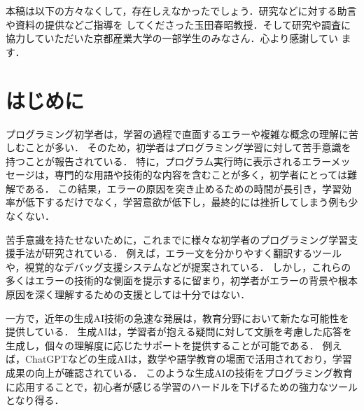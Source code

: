 \documentclass[12pt,twoside]{jbook}
\begin{document}
\begin{acknowledgments}
本稿は以下の方々なくして，存在しえなかったでしょう．研究などに対する助言や資料の提供などご指導を
してくださった玉田春昭教授．そして研究や調査に協力していただいた京都産業大学の一部学生のみなさん．心より感謝してい
ます．

\end{acknowledgments}


\tableofcontents       %

%
%

\listoffigures         %


%
%
\chapter{はじめに}

プログラミング初学者は，学習の過程で直面するエラーや複雑な概念の理解に苦しむことが多い．
そのため，初学者はプログラミング学習に対して苦手意識を持つことが報告されている\cite{2015icce_fu}．
特に，プログラム実行時に表示されるエラーメッセージは，専門的な用語や技術的な内容を含むことが多く，初学者にとっては難解である．
この結果，エラーの原因を突き止めるための時間が長引き，学習効率が低下するだけでなく，学習意欲が低下し，最終的には挫折してしまう例も少なくない\cite{2016ipsj_makihara}．

苦手意識を持たせないために，これまでに様々な初学者のプログラミング学習支援手法が研究されている\cite{2016ipsj_makihara,2021fose_akiyama}．
例えば，エラー文を分かりやすく翻訳するツールや，視覚的なデバッグ支援システムなどが提案されている\cite{2021fose_akiyama}．
しかし，これらの多くはエラーの技術的な側面を提示するに留まり，初学者がエラーの背景や根本原因を深く理解するための支援としては十分ではない．

一方で，近年の生成AI技術の急速な発展は，教育分野において新たな可能性を提供している\cite{2023jssst_tanaka}．
生成AIは，学習者が抱える疑問に対して文脈を考慮した応答を生成し，個々の理解度に応じたサポートを提供することが可能である．
例えば，ChatGPTなどの生成AIは，数学や語学教育の場面で活用されており，学習成果の向上が確認されている\cite{2023jssst_tanaka}．
このような生成AIの技術をプログラミング教育に応用することで，初心者が感じる学習のハードルを下げるための強力なツールとなり得る．
\end{document}
